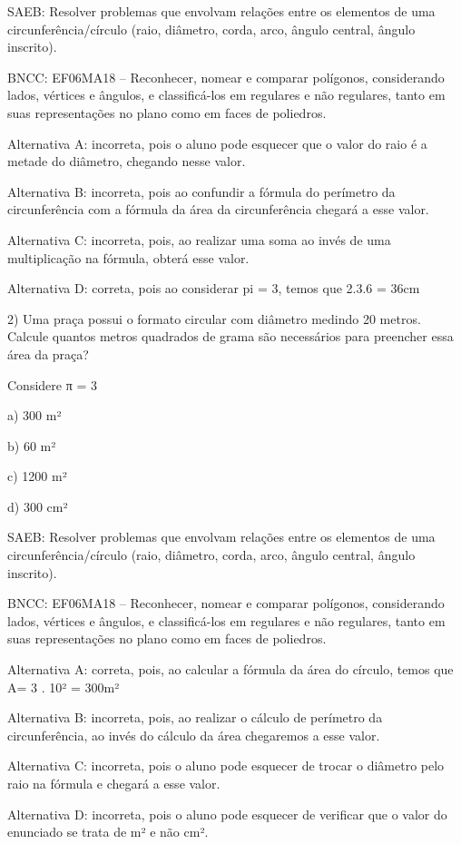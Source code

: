 SAEB: Resolver problemas que envolvam relações entre os elementos de uma
circunferência/círculo (raio, diâmetro, corda, arco, ângulo central,
ângulo inscrito).

BNCC: EF06MA18 -- Reconhecer, nomear e comparar polígonos, considerando
lados, vértices e ângulos, e classificá-los em regulares e não
regulares, tanto em suas representações no plano como em faces de
poliedros.

Alternativa A: incorreta, pois o aluno pode esquecer que o valor do raio
é a metade do diâmetro, chegando nesse valor.

Alternativa B: incorreta, pois ao confundir a fórmula do perímetro da
circunferência com a fórmula da área da circunferência chegará a esse
valor.

Alternativa C: incorreta, pois, ao realizar uma soma ao invés de uma
multiplicação na fórmula, obterá esse valor.

Alternativa D: correta, pois ao considerar pi = 3, temos que 2.3.6 =
36cm

2) Uma praça possui o formato circular com diâmetro medindo 20 metros.
Calcule quantos metros quadrados de grama são necessários para preencher
essa área da praça?

Considere π = 3

a) 300 m²

b) 60 m²

c) 1200 m²

d) 300 cm²

SAEB: Resolver problemas que envolvam relações entre os elementos de uma
circunferência/círculo (raio, diâmetro, corda, arco, ângulo central,
ângulo inscrito).

BNCC: EF06MA18 -- Reconhecer, nomear e comparar polígonos, considerando
lados, vértices e ângulos, e classificá-los em regulares e não
regulares, tanto em suas representações no plano como em faces de
poliedros.

Alternativa A: correta, pois, ao calcular a fórmula da área do círculo,
temos que A= 3 . 10² = 300m²

Alternativa B: incorreta, pois, ao realizar o cálculo de perímetro da
circunferência, ao invés do cálculo da área chegaremos a esse valor.

Alternativa C: incorreta, pois o aluno pode esquecer de trocar o
diâmetro pelo raio na fórmula e chegará a esse valor.

Alternativa D: incorreta, pois o aluno pode esquecer de verificar que o
valor do enunciado se trata de m² e não cm².

